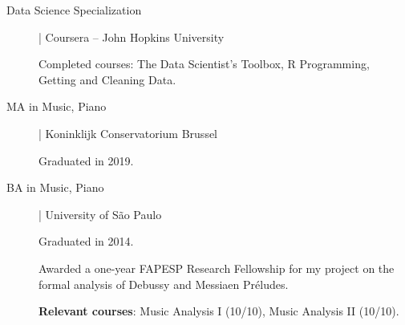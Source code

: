 \documentclass[12pt]{article}
\newcommand{\mycolor}{mySlateBlue}
\newcommand{\thesectionicon}{}
\newcommand{\sectionicon}[1]{\renewcommand{\thesectionicon}{#1}}
\begin{document}
\begin{description}

\item[\textcolor{\mycolor}{Data Science Specialization}] | Coursera -- John Hopkins University
  
  
Completed courses: The Data Scientist’s Toolbox, R Programming, Getting and Cleaning Data.  

\item[\textcolor{\mycolor}{MA in Music, Piano}] | Koninklijk Conservatorium Brussel

Graduated in 2019.

\item[\textcolor{\mycolor}{BA in Music, Piano}] | University of São Paulo

Graduated in 2014.

Awarded a one-year FAPESP Research Fellowship for my project on the formal analysis of Debussy and Messiaen Préludes.

\textbf{Relevant courses}: Music Analysis I (10/10), Music Analysis II (10/10).

\end{description}

\sectionicon{\faToolbox}
\end{document}
